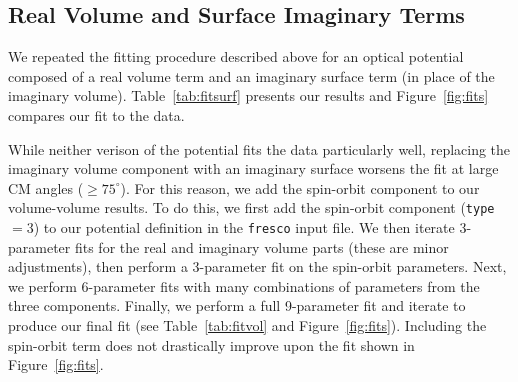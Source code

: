 \documentclass[]{scrartcl}
\begin{document}





\subsection*{Real Volume and Surface Imaginary Terms}

We repeated the fitting procedure described above for an optical potential composed of a real volume term and an imaginary surface term (in place of the imaginary volume). Table~\ref{tab:fitsurf} presents our results and Figure~\ref{fig:fits} compares our fit to the data.

While neither verison of the potential fits the data particularly well, replacing the imaginary volume component with an imaginary surface worsens the fit at large CM angles ($\geq 75 ^{\circ}$). For this reason, we add the spin-orbit component to our volume-volume results. To do this, we first add the spin-orbit component (\texttt{type}$=3$) to our potential definition in the \texttt{fresco} input file. We then iterate 3-parameter fits for the real and imaginary volume parts (these are minor adjustments), then perform a 3-parameter fit on the spin-orbit parameters. Next, we perform 6-parameter fits with many combinations of parameters from the three components. Finally, we perform a full 9-parameter fit and iterate to produce our final fit (see Table~\ref{tab:fitvol} and Figure~\ref{fig:fits}). Including the spin-orbit term does not drastically improve upon the fit shown in Figure~\ref{fig:fits}.


\end{document}

